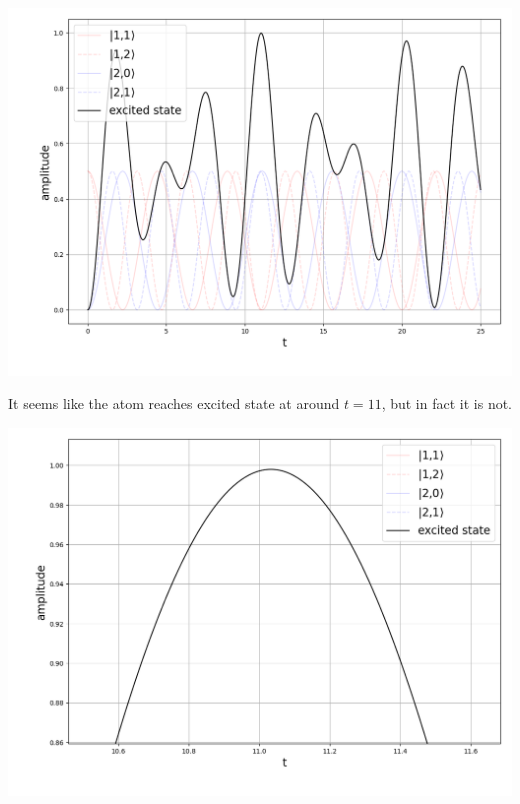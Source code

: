 \documentclass[11pt, oneside]{book}
\theoremstyle{break}
\theoremstyle{break}
\begin{document}
\begin{center}
\includegraphics[scale=0.5]{542HW5/excitedState}
\end{center}
It seems like the atom reaches excited state at around $t = 11$, but in fact it is not. 
\begin{center}
\includegraphics[scale=0.5]{542HW5/excitedStateZoomed}
\end{center}
\end{document}
